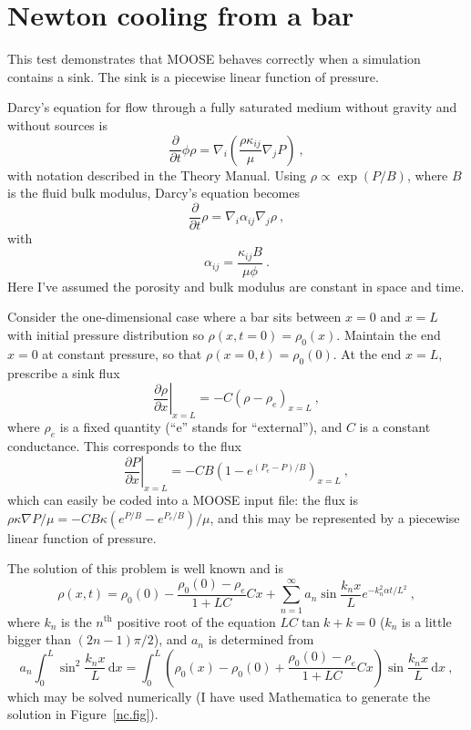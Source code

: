 \documentclass[]{scrreprt}
\begin{document}
\chapter{Newton cooling from a bar}
\label{nc}

This test demonstrates that MOOSE behaves correctly when a simulation
contains a sink.  The sink is a piecewise linear function of pressure.

Darcy's equation for flow through a fully saturated medium without
gravity and without sources is 
\begin{equation}
\frac{\partial}{\partial t}\phi\rho = \nabla_{i}\left(\frac{\rho
  \kappa_{ij}}{\mu} \nabla_{j}P \right) \ ,
\end{equation}
with notation described in the Theory Manual.  Using $\rho \propto
\exp(P/B)$, where $B$ is the fluid bulk modulus, Darcy's equation
becomes
\begin{equation}
\frac{\partial}{\partial t}\rho = \nabla_{i}\alpha_{ij}\nabla_{j}\rho \ ,
\end{equation}
with 
\begin{equation}
\alpha_{ij} = \frac{\kappa_{ij}B}{\mu\phi} \ .
\end{equation}
Here I've assumed the porosity and bulk modulus are constant in space
and time.

Consider the one-dimensional case where a bar sits between $x=0$ and
$x=L$ with initial pressure distribution so $\rho(x,t=0) = \rho_{0}(x)$.
Maintain the end $x=0$ at constant pressure, so that $\rho(x=0, t) =
\rho_{0}(0)$.  At the end $x=L$, prescribe a sink flux
\begin{equation}
\left.\frac{\partial\rho}{\partial x}\right|_{x=L} = -C\left(\rho -
\rho_{e}\right)_{x=L} \ ,
\end{equation}
where $\rho_{e}$ is a fixed quantity (``e'' stands for ``external''),
and $C$ is a constant conductance.  This corresponds to the flux
\begin{equation}
\left.\frac{\partial P}{\partial x}\right|_{x=L} = -CB\left(1 -
e^{(P_{e}-P)/B}\right)_{x=L} \ ,
\end{equation}
which can easily be coded into a MOOSE input file: the flux is
$\rho\kappa\nabla P/\mu = -CB\kappa(e^{P/B} - e^{P_{e}/B})/\mu$, and
this may be represented by a piecewise linear function of pressure.

The solution of this problem is well known and is
\begin{equation}
\rho(x, t) = \rho_{0}(0) - \frac{\rho_{0}(0) - \rho_{e}}{1 + LC}Cx +
\sum_{n=1}^{\infty} a_{n}\sin \frac{k_{n}x}{L}e^{-k_{n}^{2}\alpha
  t/L^{2}} \ ,
\end{equation}
where $k_{n}$ is the $n^{\mathrm{th}}$ positive root of the equation
$LC\tan k + k=0$  ($k_{n}$ is a little bigger than
$(2n-1)\pi/2$), and $a_{n}$ is determined from
\begin{equation}
a_{n}\int_{0}^{L}\sin^{2}\frac{k_{n}x}{L}\,\mathrm{d}x =
\int_{0}^{L}\left(\rho_{0}(x) - \rho_{0}(0) + \frac{\rho_{0}(0) -
  \rho_{e}}{1 + LC}Cx\right)\sin \frac{k_{n}x}{L}\,\mathrm{d}x \ ,
\end{equation}
which may be solved numerically (I have used Mathematica to generate
the solution in Figure~\ref{nc.fig}).
\end{document}
